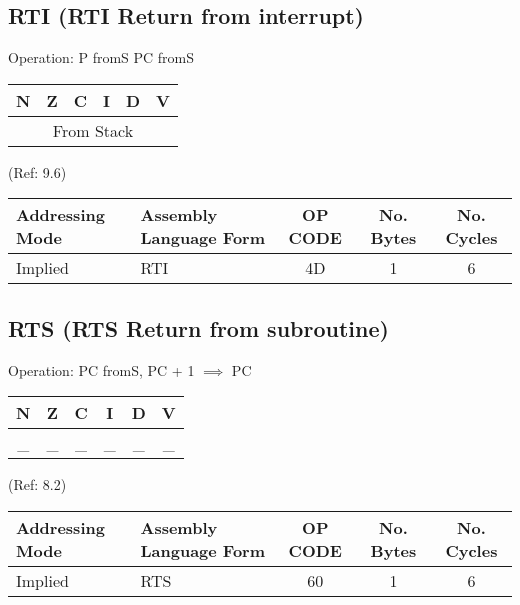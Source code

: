 \documentclass{article}
\begin{document}
  \subsection{RTI (RTI Return from interrupt)}
  Operation:  P fromS PC fromS
  \begin{table}[H]
  \centering
  \begin{tabular}{|c c c c c c|}
  \hline
  N&Z&C&I&D&V\\
  \hline
  \multicolumn{6}{|c|}{From Stack}\\
  \hline
  \end{tabular}
  \end{table}
                                 (Ref: 9.6)
  \begin{table}[H]
  \centering
  \begin{tabular}{|l|l|c|c|c|}
  \hline
    Addressing Mode& Assembly Language Form& OP CODE &No. Bytes&No. Cycles\\
  \hline
     Implied       &   RTI                 &    4D   &    1    &    6     \\
  \hline
  \end{tabular}
  \end{table}


  \subsection{RTS (RTS Return from subroutine)}
  Operation:  PC fromS, PC + 1 $\implies$ PC
  \begin{table}[H]
  \centering
  \begin{tabular}{|c c c c c c|}
  \hline
  N&Z&C&I&D&V\\
  \hline
  \_ & \_ & \_ & \_ & \_ & \_\\
  \hline
  \end{tabular}
  \end{table}
                                 (Ref: 8.2)
  \begin{table}[H]
  \centering
  \begin{tabular}{|l|l|c|c|c|}
  \hline
    Addressing Mode& Assembly Language Form& OP CODE &No. Bytes&No. Cycles\\
  \hline
     Implied       &   RTS                 &    60   &    1    &    6     \\
  \hline
  \end{tabular}
  \end{table}
\end{document}
